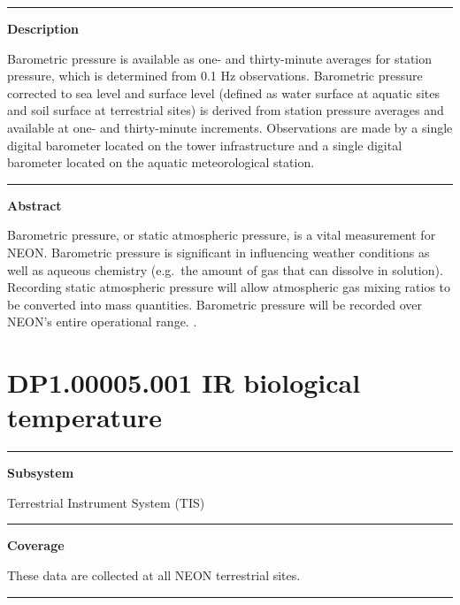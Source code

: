 \documentclass[]{article}
\begin{document}
\begin{center}\rule{0.5\linewidth}{\linethickness}\end{center}

\textbf{Description}

Barometric pressure is available as one- and thirty-minute averages for
station pressure, which is determined from 0.1 Hz observations.
Barometric pressure corrected to sea level and surface level (defined as
water surface at aquatic sites and soil surface at terrestrial sites) is
derived from station pressure averages and available at one- and
thirty-minute increments. Observations are made by a single digital
barometer located on the tower infrastructure and a single digital
barometer located on the aquatic meteorological station.

\begin{center}\rule{0.5\linewidth}{\linethickness}\end{center}

\textbf{Abstract}

Barometric pressure, or static atmospheric pressure, is a vital
measurement for NEON. Barometric pressure is significant in influencing
weather conditions as well as aqueous chemistry (e.g.~the amount of gas
that can dissolve in solution). Recording static atmospheric pressure
will allow atmospheric gas mixing ratios to be converted into mass
quantities. Barometric pressure will be recorded over NEON's entire
operational range. \newpage
.

\section{DP1.00005.001 IR biological
temperature}\label{dp1.00005.001-ir-biological-temperature}

\begin{center}\rule{0.5\linewidth}{\linethickness}\end{center}

\textbf{Subsystem}

Terrestrial Instrument System (TIS)

\begin{center}\rule{0.5\linewidth}{\linethickness}\end{center}

\textbf{Coverage}

These data are collected at all NEON terrestrial sites.

\begin{center}\rule{0.5\linewidth}{\linethickness}\end{center}
\end{document}
